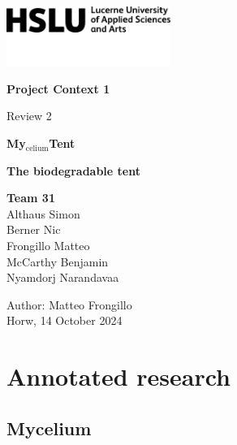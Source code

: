 \documentclass{article}
\begin{document}
\begin{titlepage}
    \includegraphics[width=0.4\textwidth]{media/hslu-svg-logo.png}

    \vspace*{-.4cm}
    {\huge \textbf{Project Context 1}}

    {\Large Review 2}

    \vspace*{3cm}
    \begin{center}
        {\Huge \textbf{My$_{\text{celium}}$Tent}}

        \vspace*{.1cm}
        \textbf{\large The biodegradable tent}

    \end{center}

    \vfill
    {\Large \textbf{Team 31}}\\
    {\large \vspace*{.01cm}
        Althaus Simon\\
        \vspace*{.01cm}
        Berner Nic\\
        \vspace*{.01cm}   
        Frongillo Matteo\\
        \vspace*{.01cm}
        McCarthy Benjamin\\
        \vspace*{.01cm}
        Nyamdorj Narandavaa\\
        \vspace*{.01cm}
    }
    
    \vspace{.75cm}
    {\large
    Author: Matteo Frongillo\\
    Horw, 14 October 2024
    }
\end{titlepage}

\tableofcontents
\thispagestyle{empty}

\newpage
\section{Annotated research}
\subsection{Mycelium}
\end{document}
